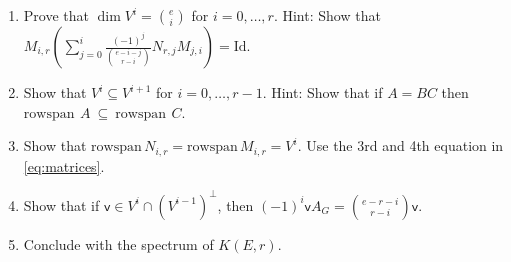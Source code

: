 \documentclass[kulak]{tplt}
\theoremstyle{definition}
\newcommand{\vv}{\mathsf{v}}
\newcommand{\rowspn}{\mathrm{rowspan}}
\newcommand{\Id}{\mathrm{Id}}
\begin{document}
\begin{enumerate}
\begin{enumerate}
\item
Prove that $\dim V^i = \binom{e}{i}$ for $i=0, \ldots, r$. 
Hint: Show that $M_{i, r} \left( \sum_{j=0}^i \frac{(-1)^j}{\binom{e-i-j}{r-i}} N_{r, j} M_{j, i}\right) = \Id$.

\item Show that $V^i \subseteq V^{i+1}$ for $i=0, \ldots, r-1$.
Hint: Show that if $A = BC $ then $\rowspn\,~A~\subseteq~\rowspn\,~C$.

\item Show that $\rowspn \, N_{i, r} = \rowspn \, M_{i, r} = V^i$.
Use the 3rd and 4th equation in \eqref{eq:matrices}.

\item Show that if $\vv \in V^i \cap (V^{i-1})^{\perp}$, then $(-1)^i \vv A_G = \binom{e-r-i}{r-i} \vv $.


\item Conclude with the spectrum of $K(E, r)$.
\end{enumerate}
\end{enumerate}
\end{document}

